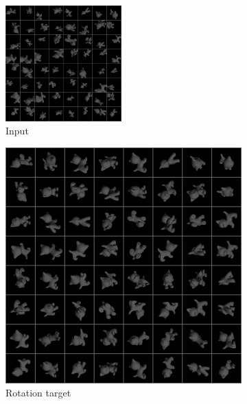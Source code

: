 \documentclass[10pt,a4paper]{article}
\begin{document}
\begin{figure}[!ht]
\centering
\begin{subfigure}{\textwidth}
	\centering
	\includegraphics[width=0.49\textwidth] {cat_input.png}
	\caption{Input}
	\label{cat_in}
\end{subfigure}
\begin{subfigure}{0.3\textwidth}
	\centering
	\includegraphics[width=\textwidth] {cat_target0.png}
	\caption{Rotation target}
	\label{cat_r}
\end{subfigure}
\begin{subfigure}{0.3\textwidth}
	\centering

\end{subfigure}
\end{figure}
\end{document}
